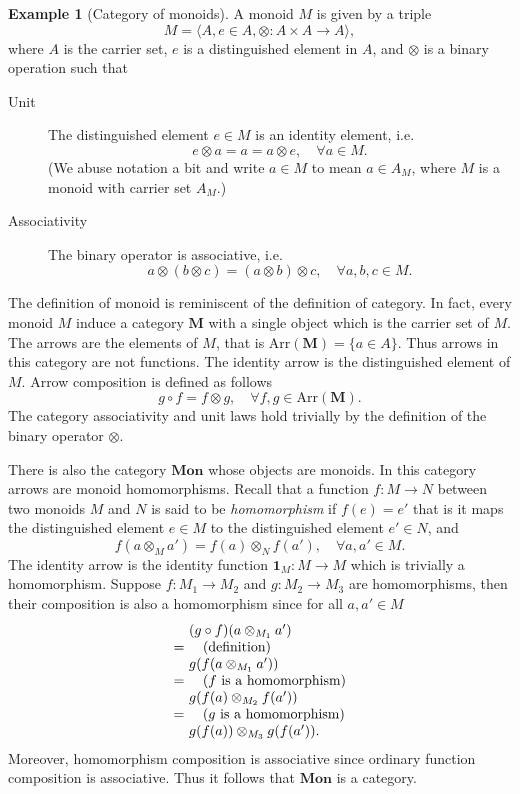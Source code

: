 \documentclass[10pt,twoside,a4paper]{article}
\makeatletter
\newcounter{theorem}
\theoremstyle{plain}
\theoremstyle{definition}
\newtheorem{example}{Example}[section]
\newcommand{\ba}{\begin{array}}
\newcommand{\ea}{\end{array}}
\newenvironment{derivation}{\small\[\ba{@{}r@{~}l@{}}}{\ea\]\normalsize\ignorespacesafterend}
\newcommand{\reason}[1]{\quad (\text{#1})}
\newcommand{\Id}[1]{%
  \ensuremath{\mathbf{1}_{#1}}%
}
\newcommand{\Arr}[1]{%
  \ensuremath{\mathrm{Arr}(#1)}%
}
\newcommand{\Catname}[1]{%
  \ensuremath{\mathbf{#1}}%
}
\newcommand{\Mon}[0]{\Catname{Mon}}
\newcommand{\Tuple}[1]{%
  \ensuremath{\langle #1 \rangle}%
}
\makeatother
\begin{document}
\begin{example}[Category of monoids]
A monoid $M$ is given by a triple
\[ M = \Tuple{A,e \in A, \otimes : A \times A \to A}, \]
where $A$ is the carrier set, $e$ is a distinguished element in $A$,
and $\otimes$ is a binary operation such that
\begin{description}
\item[Unit] The distinguished element $e \in M$ is an identity
  element, i.e.
  \[ e \otimes a = a = a \otimes e, \quad \forall a \in M. \]
  (We abuse notation a bit and write $a \in M$ to mean $a \in A_M$,
  where $M$ is a monoid with carrier set $A_M$.)
  \item[Associativity] The binary operator is associative, i.e.
    \[  a \otimes (b \otimes c) = (a \otimes b) \otimes c, \quad \forall a,b,c \in M. \]
\end{description}
The definition of monoid is reminiscent of the definition of
category. In fact, every monoid $M$ induce a category \Catname{M} with
a single object which is the carrier set of $M$. The arrows are the
elements of $M$, that is $\Arr{\Catname{M}} = \{ a \in A \}$. Thus
arrows in this category are not functions. The identity arrow is the
distinguished element of $M$. Arrow composition is defined as follows
%
\[ g \circ f = f \otimes g, \quad \forall f,g \in \Arr{\Catname{M}}. \]
%
The category associativity and unit laws hold trivially by the
definition of the binary operator $\otimes$.

There is also the category \Mon{} whose objects are monoids. In this
category arrows are monoid homomorphisms. Recall that a function
$f : M \to N$ between two monoids $M$ and $N$ is said to be
\emph{homomorphism} if $f(e) = e'$ that is it maps the distinguished
element $e \in M$ to the distinguished element $e' \in N$, and
%
\[ f(a \otimes_M a') = f(a) \otimes_N f(a'), \quad \forall a,a' \in M. \]
%
The identity arrow is the identity function $\Id{M} : M \to M$ which
is trivially a homomorphism. Suppose $f : M_1 \to M_2$ and
$g : M_2 \to M_3$ are homomorphisms, then their composition is also a
homomorphism since for all $a, a' \in M$
\begin{derivation}
  & (g \circ f)(a \otimes_{M_1} a') \\
  =& \reason{definition} \\
  & g(f(a \otimes_{M_1} a')) \\
  =& \reason{$f$ is a homomorphism} \\
  & g(f(a) \otimes_{M_2} f(a')) \\
  =& \reason{$g$ is a homomorphism} \\
  & g(f(a)) \otimes_{M_3} g(f(a')).
\end{derivation}
Moreover, homomorphism composition is associative since ordinary
function composition is associative. Thus it follows that \Mon{} is a
category.
\end{example}

%
%


\end{document}
